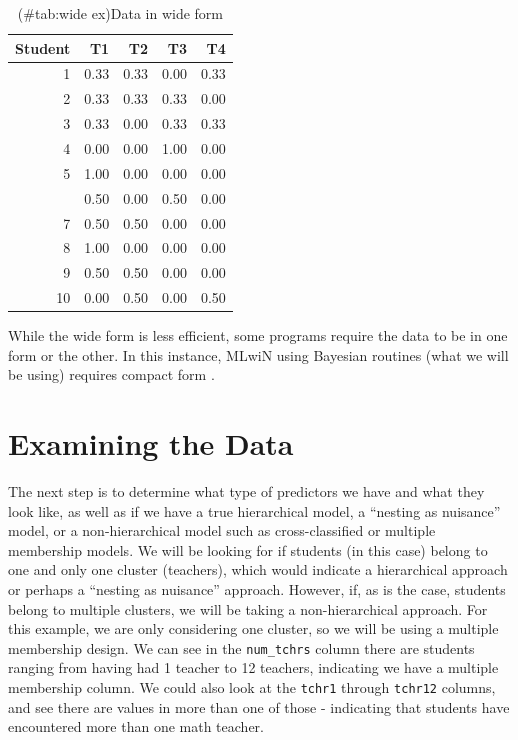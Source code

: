 \documentclass[
]{book}
\begin{document}
\begin{table}

\caption{(\#tab:wide ex)Data in wide form}
\centering
\begin{tabular}[t]{rrrrr}
\toprule
Student & T1 & T2 & T3 & T4\\
\midrule
1 & 0.33 & 0.33 & 0.00 & 0.33\\
2 & 0.33 & 0.33 & 0.33 & 0.00\\
3 & 0.33 & 0.00 & 0.33 & 0.33\\
4 & 0.00 & 0.00 & 1.00 & 0.00\\
5 & 1.00 & 0.00 & 0.00 & 0.00\\
\addlinespace
6 & 0.50 & 0.00 & 0.50 & 0.00\\
7 & 0.50 & 0.50 & 0.00 & 0.00\\
8 & 1.00 & 0.00 & 0.00 & 0.00\\
9 & 0.50 & 0.50 & 0.00 & 0.00\\
10 & 0.00 & 0.50 & 0.00 & 0.50\\
\bottomrule
\end{tabular}
\end{table}

While the wide form is less efficient, some programs require the data to be in one form or the other. In this instance, MLwiN using Bayesian routines (what we will be using) requires compact form \citep{Leckie2013}.

\hypertarget{examining-the-data}{%
\section{Examining the Data}\label{examining-the-data}}

The next step is to determine what type of predictors we have and what they look like, as well as if we have a true hierarchical model, a ``nesting as nuisance'' model, or a non-hierarchical model such as cross-classified or multiple membership models. We will be looking for if students (in this case) belong to one and only one cluster (teachers), which would indicate a hierarchical approach or perhaps a ``nesting as nuisance'' approach. However, if, as is the case, students belong to multiple clusters, we will be taking a non-hierarchical approach. For this example, we are only considering one cluster, so we will be using a multiple membership design. We can see in the \texttt{num\_tchrs} column there are students ranging from having had 1 teacher to 12 teachers, indicating we have a multiple membership column. We could also look at the \texttt{tchr1} through \texttt{tchr12} columns, and see there are values in more than one of those - indicating that students have encountered more than one math teacher.
\end{document}
